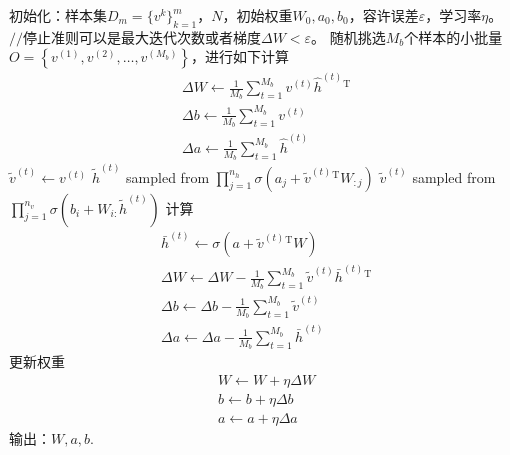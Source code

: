 {\begin{algorithm}[htbp]
                \begin{algorithmic}[1]
                    \State 初始化：样本集$D_m = \{v^k\}_{k=1}^m$，$N$，初始权重$W_0,a_0,b_0$，容许误差$\varepsilon$，学习率$\eta$。
                        \State $//$停止准则可以是最大迭代次数或者梯度$\Delta W < \varepsilon$。
                        \State 随机挑选$M_b$个样本的小批量$O = \left\{v^{(1)},v^{(2)},\dots,v^{(M_b)}\right\}$，进行如下计算
                        \begin{align*}
                        & \Delta W \leftarrow \frac{1}{M_b}\sum_{t=1}^{M_b}v^{(t)}\hat{h}^{(t)}{}^\mathrm{T}\\
                        & \Delta b \leftarrow \frac{1}{M_b}\sum_{t=1}^{M_b}v^{(t)}\\
                        & \Delta a \leftarrow \frac{1}{M_b}\sum_{t=1}^{M_b}\hat{h}^{(t)}
                        \end{align*}
                            \State $\tilde{v}^{(t)} \leftarrow v^{(t)}$
                        \EndFor
                                \State $\tilde{h}^{(t)}$ sampled from
                                $\prod_{j=1}^{n_h}\sigma \left( a_j+\tilde{v}^{(t)}{}^\mathrm{T} W_{:j} \right) $
                                \State $\tilde{v}^{(t)}$ sampled from
                                $\prod_{j=1}^{n_v}\sigma \left( b_i+W_{i:}\tilde{h}^{(t)} \right)$
                            \EndFor
                        \EndFor
                        \State 计算
                        \begin{align*}
                        & \bar{h}^{(t)} \leftarrow \sigma \left( a+ \tilde{v}^{(t)}{}^\mathrm{T}W \right) \\
                        & \Delta W \leftarrow \Delta W - \frac{1}{M_b}\sum_{t=1}^{M_b} \tilde{v}^{(t)}\bar{h}^{(t)}{}^\mathrm{T}\\
                        & \Delta b \leftarrow \Delta b - \frac{1}{M_b}\sum_{t=1}^{M_b} \tilde{v}^{(t)}\\
                        & \Delta a \leftarrow \Delta a - \frac{1}{M_b}\sum_{t=1}^{M_b} \bar{h}^{(t)}
                        \end{align*}
                        \State 更新权重
                        \begin{align*}
                        & W \leftarrow W + \eta \Delta W\\
                        & b \leftarrow b+ \eta \Delta b\\
                        & a \leftarrow a+ \eta \Delta a
                        \end{align*}
                    \EndWhile
                    \State 输出：$W,a,b$.
                \end{algorithmic}
            \end{algorithm}

}
